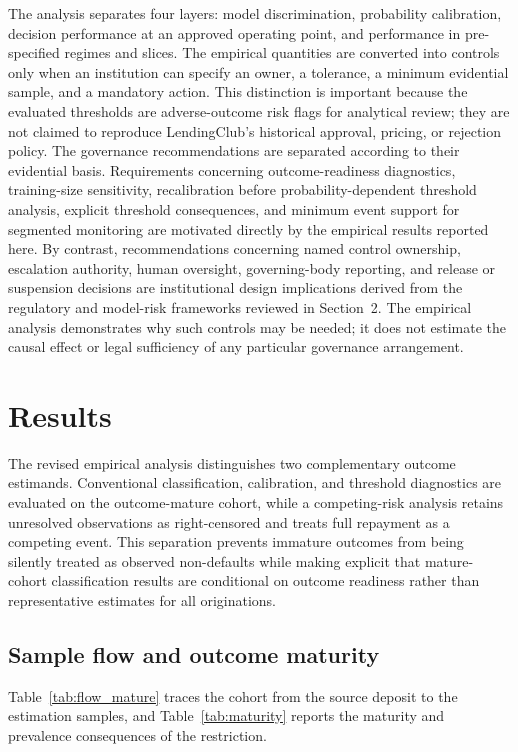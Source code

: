 \documentclass[10pt]{article}
\begin{document}
The analysis separates four layers: model discrimination, probability calibration, decision performance at an approved operating point, and performance in pre-specified regimes and slices. The empirical quantities are converted into controls only when an institution can specify an owner, a tolerance, a minimum evidential sample, and a mandatory action. This distinction is important because the evaluated thresholds are adverse-outcome risk flags for analytical review; they are not claimed to reproduce LendingClub's historical approval, pricing, or rejection policy. The governance recommendations are separated according to their evidential basis. Requirements concerning outcome-readiness diagnostics, training-size sensitivity, recalibration before probability-dependent threshold analysis, explicit threshold consequences, and minimum event support for segmented monitoring are motivated directly by the empirical results reported here. By contrast, recommendations concerning named control ownership, escalation authority, human oversight, governing-body reporting, and release or suspension decisions are institutional design implications derived from the regulatory and model-risk frameworks reviewed in Section~2. The empirical analysis demonstrates why such controls may be needed; it does not estimate the causal effect or legal sufficiency of any particular governance arrangement.

\section{Results}
\label{sec:reanalysis}

The revised empirical analysis distinguishes two complementary outcome estimands. Conventional classification, calibration, and threshold diagnostics are evaluated on the outcome-mature cohort, while a competing-risk analysis retains unresolved observations as right-censored and treats full repayment as a competing event. This separation prevents immature outcomes from being silently treated as observed non-defaults while making explicit that mature-cohort classification results are conditional on outcome readiness rather than representative estimates for all originations.

\subsection{Sample flow and outcome maturity}

Table~\ref{tab:flow_mature} traces the cohort from the source deposit to the estimation samples, and Table~\ref{tab:maturity} reports the maturity and prevalence consequences of the restriction.
\end{document}
